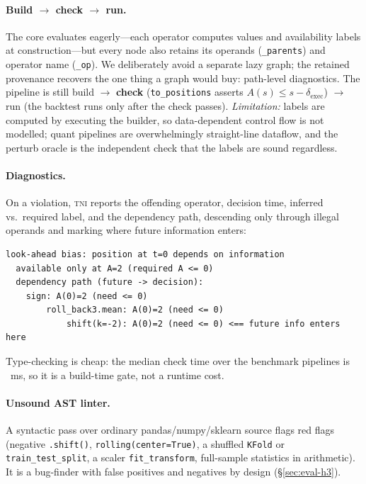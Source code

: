 \documentclass[11pt]{article}
\newcommand{\tni}{\textsc{tni}}
\theoremstyle{plain}
\theoremstyle{definition}
\begin{document}
\paragraph{Build $\to$ check $\to$ run.}
The core evaluates eagerly---each operator computes values and availability
labels at construction---but every node also retains its operands
(\texttt{\_parents}) and operator name (\texttt{\_op}). We deliberately avoid a
separate lazy graph; the retained provenance recovers the one thing a graph would
buy: path-level diagnostics. The pipeline is still build $\to$ \textbf{check}
(\texttt{to\_positions} asserts $A(s)\le s-\delta_{\text{exec}}$) $\to$ run (the
backtest runs only after the check passes). \emph{Limitation:} labels are
computed by executing the builder, so data-dependent control flow is not
modelled; quant pipelines are overwhelmingly straight-line dataflow, and the
perturb oracle is the independent check that the labels are sound regardless.

\paragraph{Diagnostics.}
On a violation, \tni{} reports the offending operator, decision time, inferred vs.\
required label, and the dependency path, descending only through illegal operands
and marking where future information enters:

\begin{lstlisting}[style=plain]
look-ahead bias: position at t=0 depends on information
  available only at A=2 (required A <= 0)
  dependency path (future -> decision):
    sign: A(0)=2 (need <= 0)
        roll_back3.mean: A(0)=2 (need <= 0)
            shift(k=-2): A(0)=2 (need <= 0) <== future info enters here
\end{lstlisting}

Type-checking is cheap: the median check time over the benchmark pipelines is
\checkMedianMs~ms, so it is a build-time gate, not a runtime cost.

\paragraph{Unsound AST linter.}
A syntactic pass over ordinary pandas/numpy/sklearn source flags red flags
(negative \texttt{.shift()}, \texttt{rolling(center=True)}, a shuffled
\texttt{KFold} or \texttt{train\_test\_split}, a scaler \texttt{fit\_transform},
full-sample statistics in arithmetic). It is a bug-finder with false positives
and negatives by design (\S\ref{sec:eval-h3}).
\end{document}

